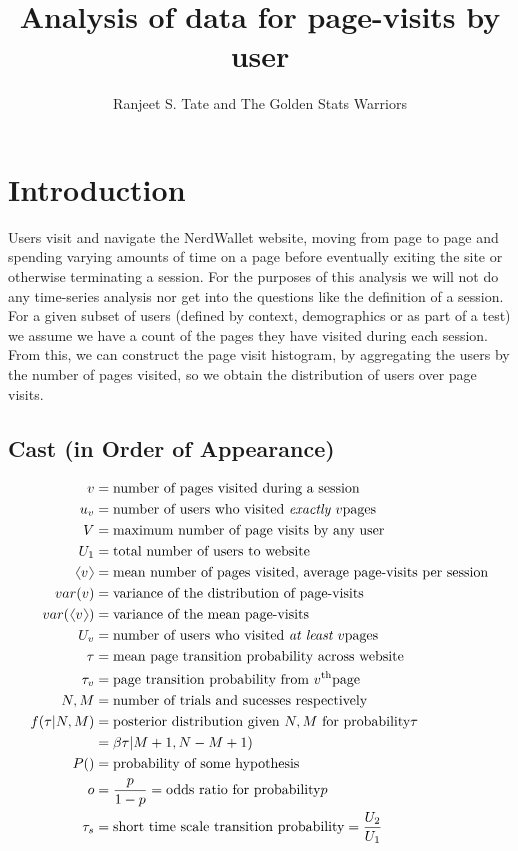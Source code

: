 \documentclass[12pt]{report}
\newcommand{\beq}{\begin{equation}} %
\newcommand{\eeq}{\end{equation}} %
\newcommand{\langl}{\begin{picture}(4.5,7)
\put(1.1,2.5){\rotatebox{60}{\line(1,0){5.5}}}
\put(1.1,2.5){\rotatebox{300}{\line(1,0){5.5}}}
\end{picture}}
\newcommand{\rangl}{\begin{picture}(4.5,7)
\put(.9,2.5){\rotatebox{120}{\line(1,0){5.5}}}
\put(.9,2.5){\rotatebox{240}{\line(1,0){5.5}}}
\end{picture}}
\newcommand{\mymean}[1]{\ensuremath{\langl{#1}\rangl}} %
\begin{document}
\title{Analysis of data for page-visits by user}
\author{Ranjeet S. Tate and The Golden Stats Warriors}
\date{}
\maketitle

\section{Introduction}
Users visit and navigate the NerdWallet website, moving from page to
page and spending varying amounts of time on a page before eventually
exiting the site or otherwise terminating a session. For the purposes
of this analysis we will not do any time-series analysis nor get
into the questions like the definition of a session. For a given
subset of users (defined by context, demographics or as part of a
test) we assume we have a count of the pages they have visited during
each session. From this, we can construct the page visit histogram, by
aggregating the users by the number of pages visited, so we obtain the
distribution of users over page visits.

\subsection{Cast (in Order of Appearance)}

\beq
\begin{split}
  v &= \text{number of pages visited during a session}\\
  u_v &= \text{number of users who visited {\em exactly }} v \text{pages}\\
  V &= \text{maximum number of page visits by any user}\\
  U_1 &= \text{total number of users to website}\\
  \mymean{v} &= \text{mean number of pages visited, average page-visits per session}\\
  var(v) &= \text{variance of the distribution of page-visits}\\
  var(\mymean{v}) &= \text{variance of the mean page-visits}\\
  U_v &= \text{number of users who visited {\em at least }} v \text{pages}\\
  \tau &= \text{mean page transition probability across website}\\
  \tau_v &= \text{page transition probability from } v^\text{th}\text{page}\\
  N, M &= \text{number of trials and sucesses respectively}\\
  f(\tau|N,M) &= \text{posterior distribution given } N,M \text{ for probability} \tau\\
  &= \beta\tau|M+1,N-M+1)\\
  P() &= \text{probability of some hypothesis}\\
  o &= \frac{p}{1-p} = \text{odds ratio for probability} p\\
  \tau_s &= \text{short time scale transition probability} = \frac{U_2}{U_1} 
\end{split}
\eeq
\end{document}
